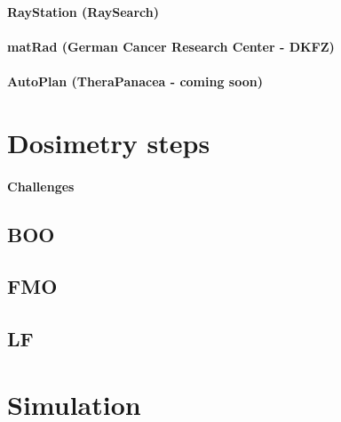 \paragraph{RayStation (RaySearch)}
\paragraph{matRad (German Cancer Research Center - DKFZ)}
\paragraph{AutoPlan (TheraPanacea - coming soon)}

\section{Dosimetry steps}
\paragraph{Challenges}
\subsection{BOO}
\subsection{FMO}
\subsection{LF}

\section{Simulation}
